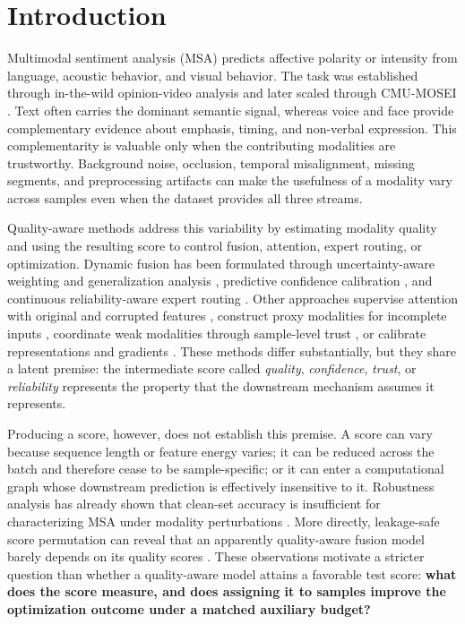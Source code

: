 \section{Introduction}\label{introduction}

Multimodal sentiment analysis (MSA) predicts affective polarity or
intensity from language, acoustic behavior, and visual behavior. The
task was established through in-the-wild opinion-video analysis and
later scaled through CMU-MOSEI
\cite{zadeh2016multimodal, zadeh2018mosei}. Text often carries the
dominant semantic signal, whereas voice and face provide complementary
evidence about emphasis, timing, and non-verbal expression. This
complementarity is valuable only when the contributing modalities are
trustworthy. Background noise, occlusion, temporal misalignment, missing
segments, and preprocessing artifacts can make the usefulness of a
modality vary across samples even when the dataset provides all three
streams.

Quality-aware methods address this variability by estimating modality
quality and using the resulting score to control fusion, attention,
expert routing, or optimization. Dynamic fusion has been formulated
through uncertainty-aware weighting and generalization analysis
\cite{zhang2023qmf}, predictive confidence calibration
\cite{cao2024pdf}, and continuous reliability-aware expert routing
\cite{zhu2026qamoe}. Other approaches supervise attention with original
and corrupted features \cite{mai2025samlml}, construct proxy modalities
for incomplete inputs \cite{zhu2025prmf}, coordinate weak modalities
through sample-level trust \cite{he2026ebmc}, or calibrate
representations and gradients \cite{jiang2026cpsc}. These methods
differ substantially, but they share a latent premise: the intermediate
score called \emph{quality}, \emph{confidence}, \emph{trust}, or
\emph{reliability} represents the property that the downstream mechanism
assumes it represents.

Producing a score, however, does not establish this premise. A score can
vary because sequence length or feature energy varies; it can be reduced
across the batch and therefore cease to be sample-specific; or it can
enter a computational graph whose downstream prediction is effectively
insensitive to it. Robustness analysis has already shown that clean-set
accuracy is insufficient for characterizing MSA under modality
perturbations \cite{hazarika2022robustness}. More directly,
leakage-safe score permutation can reveal that an apparently
quality-aware fusion model barely depends on its quality scores
\cite{moon2026quality}. These observations motivate a stricter question
than whether a quality-aware model attains a favorable test score:
\textbf{what does the score measure, and does assigning it to samples
improve the optimization outcome under a matched auxiliary budget?}

